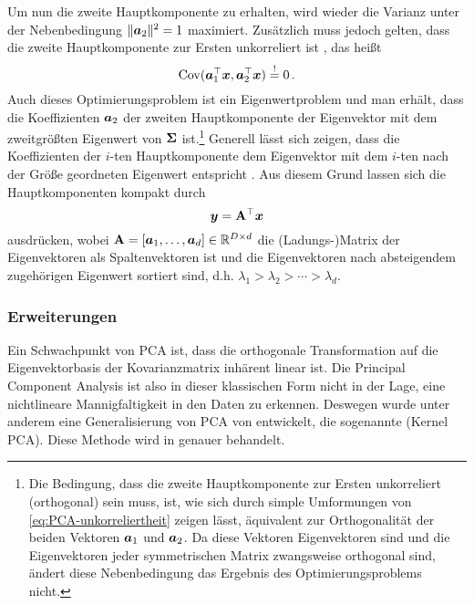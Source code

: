 Um nun die zweite Hauptkomponente zu erhalten, wird wieder die Varianz unter der Nebenbedingung
$\lVert\bm{a}_2\rVert^2 = 1$ maximiert. Zusätzlich muss jedoch gelten, dass die zweite Hauptkomponente
zur Ersten unkorreliert ist \parencite[5]{Jolliffe.2002}, das heißt
\begin{equation}
	\label{eq:PCA-unkorreliertheit}
	\operatorname{Cov}(\bm{a}_1^\top\bm{x}, \bm{a}_2^\top\bm{x}) \overset{!}{=} 0 \, .
\end{equation}
Auch dieses Optimierungsproblem ist ein Eigenwertproblem und man erhält, dass die Koeffizienten $\bm{a}_2$ der zweiten Hauptkomponente der Eigenvektor mit dem zweitgrößten Eigenwert von $\mathbf{\Sigma}$ ist.\footnote{Die Bedingung, dass die zweite Hauptkomponente zur Ersten unkorreliert (orthogonal) sein muss, ist, wie sich durch simple Umformungen von \eqref{eq:PCA-unkorreliertheit} zeigen lässt, äquivalent zur Orthogonalität der beiden Vektoren $\bm{a}_1$ und $\bm{a}_2$. Da diese Vektoren Eigenvektoren sind und die Eigenvektoren jeder symmetrischen Matrix zwangsweise orthogonal sind, ändert diese Nebenbedingung das Ergebnis des Optimierungsproblems nicht.}
Generell lässt sich zeigen, dass die Koeffizienten der $i$-ten Hauptkomponente dem Eigenvektor mit dem $i$-ten nach der Größe geordneten Eigenwert entspricht \parencite[6]{Jolliffe.2002}. Aus diesem Grund lassen sich die Hauptkomponenten kompakt durch
\begin{equation}
	\bm{y} = \mathbf{A}^\top \bm{x}
\end{equation}
ausdrücken, wobei $\mathbf{A} = [\bm{a}_1,\ldots,\bm{a}_d] \in \mathbb{R}^{D \times d}$ die (Ladungs-)Matrix der Eigenvektoren als Spaltenvektoren ist und die Eigenvektoren nach absteigendem zugehörigen Eigenwert sortiert sind, d.h. $\lambda_1 > \lambda_2 > \cdots > \lambda_d$.

\subsubsection{Erweiterungen}
\label{ch:MethodenDerDimRed:statistisch:PCA:Erweiterungen}

Ein Schwachpunkt von PCA ist, dass die orthogonale Transformation auf die Eigenvektorbasis der
Kovarianzmatrix inhärent linear ist. Die Principal Component Analysis ist also in dieser
klassischen Form nicht in der Lage, eine nichtlineare Mannigfaltigkeit in den Daten zu erkennen.
Deswegen wurde unter anderem eine Generalisierung von PCA von \textcite{Scholkopf.1997} entwickelt,
die sogenannte  (Kernel PCA). Diese Methode wird in
 genauer behandelt.

